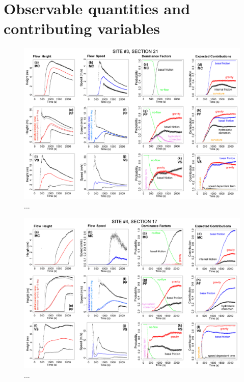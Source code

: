 \documentclass{article}
\begin{document}
\section{Observable quantities and contributing variables}

\begin{figure}[H]
\centering
\includegraphics[width=1\textwidth]{Fig5.png}
\caption{...}
\label{Fig5}
\end{figure}

\begin{figure}[H]
\centering
\includegraphics[width=1\textwidth]{Fig6.png}
\caption{...}
\label{Fig6}
\end{figure}
\end{document}
